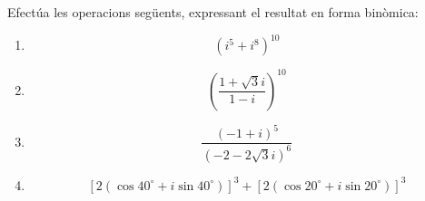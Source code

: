 \begin{exercici}
Efectúa les operacions següents, expressant el resultat en forma binòmica:

\begin{enumerate}
\item[a)]
\[
(i^{5}+i^{8})^{10}
\]

\item[b)]
\[
\left( \frac{1+\sqrt{3}i}{1-i}\right) ^{10}
\]

\item[c)]
\[
\frac{(-1+i)^{5}}{(-2-2\sqrt{3}i)^{6}}
\]

\item[d)]
\[
\left[ 2(\cos 40
^{\circ}
+i\sin 40
^{\circ}
)\right] ^{3}+\left[ 2(\cos 20
^{\circ}
+i\sin 20
^{\circ}
)\right] ^{3}
\]
\end{enumerate}
\end{exercici}

